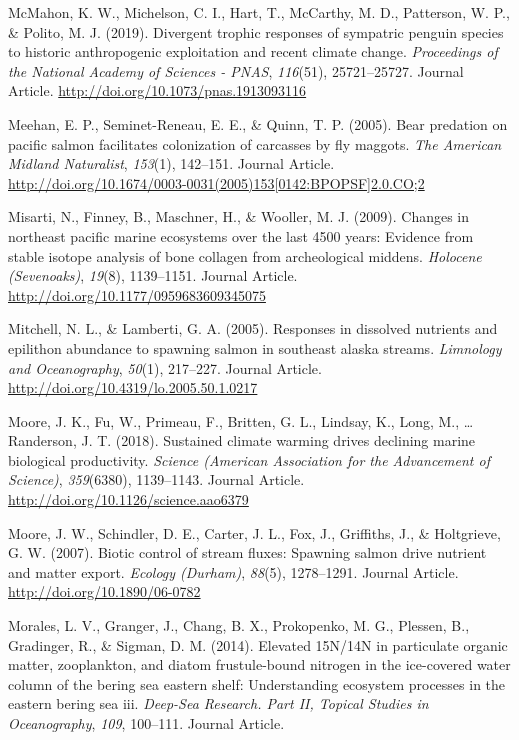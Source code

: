 \documentclass [11pt, proquest] {uwthesis}[2015/03/03]
\begin{document}
\hypertarget{ref-McMahon2019}{}
McMahon, K. W., Michelson, C. I., Hart, T., McCarthy, M. D., Patterson,
W. P., \& Polito, M. J. (2019). Divergent trophic responses of sympatric
penguin species to historic anthropogenic exploitation and recent
climate change. \emph{Proceedings of the National Academy of Sciences -
PNAS}, \emph{116}(51), 25721--25727. Journal Article.
\url{http://doi.org/10.1073/pnas.1913093116}

\hypertarget{ref-Meehan2005}{}
Meehan, E. P., Seminet-Reneau, E. E., \& Quinn, T. P. (2005). Bear
predation on pacific salmon facilitates colonization of carcasses by fly
maggots. \emph{The American Midland Naturalist}, \emph{153}(1),
142--151. Journal Article.
\href{http://doi.org/10.1674/0003-0031(2005)153\%5B0142:BPOPSF\%5D2.0.CO;2}{http://doi.org/10.1674/0003-0031(2005)153{[}0142:BPOPSF{]}2.0.CO;2}

\hypertarget{ref-Misarti2009}{}
Misarti, N., Finney, B., Maschner, H., \& Wooller, M. J. (2009). Changes
in northeast pacific marine ecosystems over the last 4500 years:
Evidence from stable isotope analysis of bone collagen from
archeological middens. \emph{Holocene (Sevenoaks)}, \emph{19}(8),
1139--1151. Journal Article.
\url{http://doi.org/10.1177/0959683609345075}

\hypertarget{ref-Mitchell2005}{}
Mitchell, N. L., \& Lamberti, G. A. (2005). Responses in dissolved
nutrients and epilithon abundance to spawning salmon in southeast alaska
streams. \emph{Limnology and Oceanography}, \emph{50}(1), 217--227.
Journal Article. \url{http://doi.org/10.4319/lo.2005.50.1.0217}

\hypertarget{ref-Moore2018}{}
Moore, J. K., Fu, W., Primeau, F., Britten, G. L., Lindsay, K., Long,
M., \ldots{} Randerson, J. T. (2018). Sustained climate warming drives
declining marine biological productivity. \emph{Science (American
Association for the Advancement of Science)}, \emph{359}(6380),
1139--1143. Journal Article.
\url{http://doi.org/10.1126/science.aao6379}

\hypertarget{ref-Moore2007}{}
Moore, J. W., Schindler, D. E., Carter, J. L., Fox, J., Griffiths, J.,
\& Holtgrieve, G. W. (2007). Biotic control of stream fluxes: Spawning
salmon drive nutrient and matter export. \emph{Ecology (Durham)},
\emph{88}(5), 1278--1291. Journal Article.
\url{http://doi.org/10.1890/06-0782}

\hypertarget{ref-Morales2014}{}
Morales, L. V., Granger, J., Chang, B. X., Prokopenko, M. G., Plessen,
B., Gradinger, R., \& Sigman, D. M. (2014). Elevated 15N/14N in
particulate organic matter, zooplankton, and diatom frustule-bound
nitrogen in the ice-covered water column of the bering sea eastern
shelf: Understanding ecosystem processes in the eastern bering sea iii.
\emph{Deep-Sea Research. Part II, Topical Studies in Oceanography},
\emph{109}, 100--111. Journal Article.
\end{document}
